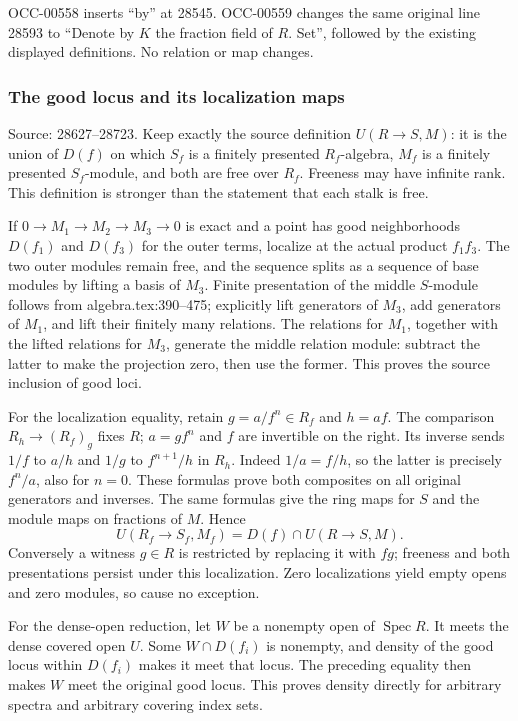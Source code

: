 OCC-00558 inserts ``by'' at 28545. OCC-00559 changes the same original line 28593 to ``Denote by \(K\) the fraction field of \(R\). Set'', followed by the existing displayed definitions. No relation or map changes.

\subsubsection{The good locus and its localization maps}\label{the-good-locus-and-its-localization-maps}

Source: 28627--28723. Keep exactly the source definition \(U(R\to S,M)\): it is the union of \(D(f)\) on which \(S_f\) is a finitely presented \(R_f\)-algebra, \(M_f\) is a finitely presented \(S_f\)-module, and both are free over \(R_f\). Freeness may have infinite rank. This definition is stronger than the statement that each stalk is free.

If \(0\to M_1\to M_2\to M_3\to0\) is exact and a point has good neighborhoods \(D(f_1)\) and \(D(f_3)\) for the outer terms, localize at the actual product \(f_1f_3\). The two outer modules remain free, and the sequence splits as a sequence of base modules by lifting a basis of \(M_3\). Finite presentation of the middle \(S\)-module follows from algebra.tex:390--475; explicitly lift generators of \(M_3\), add generators of \(M_1\), and lift their finitely many relations. The relations for \(M_1\), together with the lifted relations for \(M_3\), generate the middle relation module: subtract the latter to make the projection zero, then use the former. This proves the source inclusion of good loci.

For the localization equality, retain \(g=a/f^n\in R_f\) and \(h=af\). The comparison \(R_h\to(R_f)_g\) fixes \(R\); \(a=g f^n\) and \(f\) are invertible on the right. Its inverse sends \(1/f\) to \(a/h\) and \(1/g\) to \(f^{n+1}/h\) in \(R_h\). Indeed \(1/a=f/h\), so the latter is precisely \(f^n/a\), also for \(n=0\). These formulas prove both composites on all original generators and inverses. The same formulas give the ring maps for \(S\) and the module maps on fractions of \(M\). Hence \[
 U(R_f\to S_f,M_f)=D(f)\cap U(R\to S,M).
\] Conversely a witness \(g\in R\) is restricted by replacing it with \(fg\); freeness and both presentations persist under this localization. Zero localizations yield empty opens and zero modules, so cause no exception.

For the dense-open reduction, let \(W\) be a nonempty open of \(\operatorname{Spec}R\). It meets the dense covered open \(U\). Some \(W\cap D(f_i)\) is nonempty, and density of the good locus within \(D(f_i)\) makes it meet that locus. The preceding equality then makes \(W\) meet the original good locus. This proves density directly for arbitrary spectra and arbitrary covering index sets.


